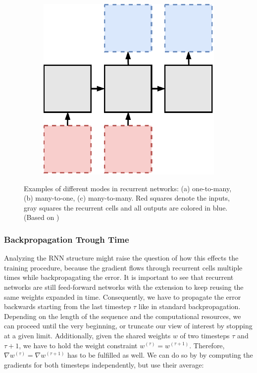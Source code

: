 \begin{figure}[htpb]
\begin{subfigure}{0.3\textwidth}
  \centering
  \includegraphics[width=.8\linewidth]{figures/many2many.pdf}
  \caption{}
  \label{fig:rnn-many2many}
\end{subfigure}
\caption[Modes in recurrent networks]{Examples of different modes in recurrent networks: (a) one-to-many, (b) many-to-one, (c) many-to-many. Red squares denote the inputs, gray squares the recurrent cells and all outputs are colored in blue. (Based on \parencite{rnn-effectiveness})}
\label{fig:rnn-modes}
\end{figure}


\subsubsection{Backpropagation Trough Time}

Analyzing the RNN structure might raise the question of how this effects the training procedure, because the gradient flows through recurrent cells multiple times while backpropagating the error. It is important to see that recurrent networks are still feed-forward networks with the extension to keep reusing the same weights expanded in time. Consequently, we have to propagate the error backwards starting from the last timestep $ \tau $ like in standard backpropagation. Depending on the length of the sequence and the computational resources, we can proceed until the very beginning, or truncate our view of interest by stopping at a given limit. Additionally, given the shared weights $ w $ of two timesteps $\tau $ and $ \tau+1 $, we have to hold the weight constraint $ w^{(\tau)} = w^{(\tau+1)} $. Therefore, $ \nabla w^{(\tau)} = \nabla w^{(\tau+1)} $ has to be fulfilled as well. We can do so by by computing the gradients for both timesteps independently, but use their average:

